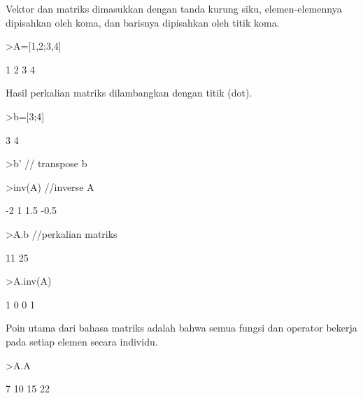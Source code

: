 \documentclass[12pt,arial,letterpaper]{book}
\begin{document}
\begin{eulercomment}
\begin{eulercomment}
\begin{eulercomment}
Vektor dan matriks dimasukkan dengan tanda kurung siku,
elemen-elemennya dipisahkan oleh koma, dan barisnya dipisahkan oleh
titik koma.
\end{eulercomment}
\begin{eulerprompt}
>A=[1,2;3,4]
\end{eulerprompt}
\begin{euleroutput}
              1             2 
              3             4 
\end{euleroutput}
\begin{eulercomment}
Hasil perkalian matriks dilambangkan dengan titik (dot).
\end{eulercomment}
\begin{eulerprompt}
>b=[3;4]
\end{eulerprompt}
\begin{euleroutput}
              3 
              4 
\end{euleroutput}
\begin{eulerprompt}
>b' // transpose b
\end{eulerprompt}
\begin{euleroutput}
  [3,  4]
\end{euleroutput}
\begin{eulerprompt}
>inv(A) //inverse A
\end{eulerprompt}
\begin{euleroutput}
             -2             1 
            1.5          -0.5 
\end{euleroutput}
\begin{eulerprompt}
>A.b //perkalian matriks
\end{eulerprompt}
\begin{euleroutput}
             11 
             25 
\end{euleroutput}
\begin{eulerprompt}
>A.inv(A)
\end{eulerprompt}
\begin{euleroutput}
              1             0 
              0             1 
\end{euleroutput}
\begin{eulercomment}
Poin utama dari bahasa matriks adalah bahwa semua fungsi dan operator
bekerja pada setiap elemen secara individu.
\end{eulercomment}
\begin{eulerprompt}
>A.A
\end{eulerprompt}
\begin{euleroutput}
              7            10 
             15            22 

\end{euleroutput}
\end{eulercomment}
\end{eulercomment}
\end{document}

